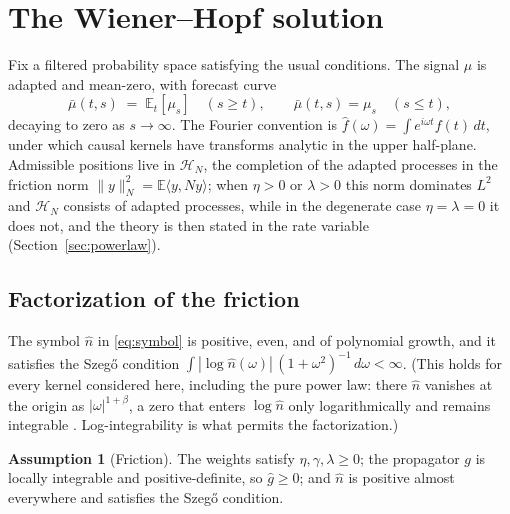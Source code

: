 \documentclass[11pt]{article}
\newcommand{\E}{\mathbb{E}}
\theoremstyle{plain}
\theoremstyle{definition}
\newtheorem{assumption}{Assumption}
\theoremstyle{remark}
\begin{document}
\section{The Wiener--Hopf solution}\label{sec:interior}

Fix a filtered probability space satisfying the usual conditions. The signal $\mu$ is adapted and mean-zero, with forecast curve
\[
\bar\mu(t,s) \;=\; \E_t[\mu_s] \quad (s\ge t), \qquad \bar\mu(t,s)=\mu_s \quad (s\le t),
\]
decaying to zero as $s\to\infty$. The Fourier convention is $\hat f(\omega)=\int e^{i\omega t}f(t)\,dt$, under which causal kernels have transforms analytic in the upper half-plane. Admissible positions live in $\mathcal H_N$, the completion of the adapted processes in the friction norm $\|y\|_N^2=\E\langle y,Ny\rangle$; when $\eta>0$ or $\lambda>0$ this norm dominates $L^2$ and $\mathcal H_N$ consists of adapted processes, while in the degenerate case $\eta=\lambda=0$ it does not, and the theory is then stated in the rate variable (Section~\ref{sec:powerlaw}).

\subsection{Factorization of the friction}\label{sec:factor}

The symbol $\hat n$ in \eqref{eq:symbol} is positive, even, and of polynomial growth, and it satisfies the Szeg\H{o} condition $\int|\log\hat n(\omega)|\,(1+\omega^2)^{-1}\,d\omega<\infty$. (This holds for every kernel considered here, including the pure power law: there $\hat n$ vanishes at the origin as $|\omega|^{1+\beta}$, a zero that enters $\log\hat n$ only logarithmically and remains integrable \citep{Krein1962}. Log-integrability is what permits the factorization.)

\begin{assumption}[Friction]\label{ass:friction}
The weights satisfy $\eta,\gamma,\lambda\ge0$; the propagator $g$ is locally integrable and positive-definite, so $\hat g\ge0$; and $\hat n$ is positive almost everywhere and satisfies the Szeg\H{o} condition.
\end{assumption}
\end{document}
